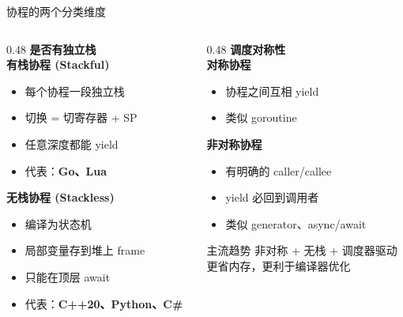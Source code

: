 \documentclass[aspectratio=169, 10pt]{beamer}
\begin{document}
\begin{frame}{协程的两个分类维度}
  \begin{columns}[T]
    \begin{column}{0.48\textwidth}
      \textbf{是否有独立栈}\\[0.3cm]
      \textcolor{blue!70}{\textbf{有栈协程 (Stackful)}}
      \begin{itemize}
        \item 每个协程一段独立栈
        \item 切换 = 切寄存器 + SP
        \item 任意深度都能 yield
        \item 代表：\textbf{Go、Lua}
      \end{itemize}
      \vspace{0.2cm}
      \textcolor{orange!80!black}{\textbf{无栈协程 (Stackless)}}
      \begin{itemize}
        \item 编译为状态机
        \item 局部变量存到堆上 frame
        \item 只能在顶层 await
        \item 代表：\textbf{C++20、Python、C\#}
      \end{itemize}
    \end{column}
    \begin{column}{0.48\textwidth}
      \textbf{调度对称性}\\[0.3cm]
      \textcolor{blue!70}{\textbf{对称协程}}
      \begin{itemize}
        \item 协程之间互相 yield
        \item 类似 goroutine
      \end{itemize}
      \vspace{0.2cm}
      \textcolor{orange!80!black}{\textbf{非对称协程}}
      \begin{itemize}
        \item 有明确的 caller/callee
        \item yield 必回到调用者
        \item 类似 generator、async/await
      \end{itemize}

      \vspace{0.4cm}
      \begin{block}{主流趋势}
        非对称 + 无栈 + 调度器驱动\\
        更省内存，更利于编译器优化
      \end{block}
    \end{column}
  \end{columns}
\end{frame}
\end{document}

